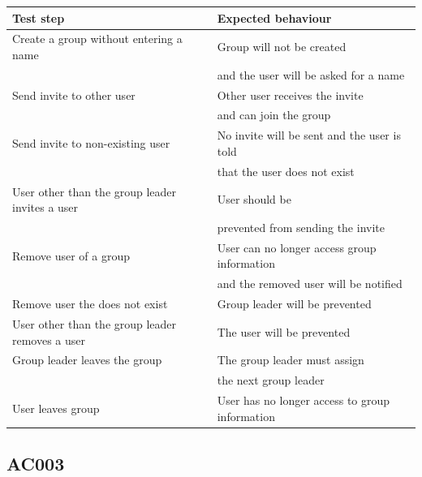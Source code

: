 \documentclass[12pt]{article}
\theoremstyle{definition}
\begin{document}
\begin{tabular}{|l|l|}
\hline
Test step & Expected behaviour \\ \hline
Create a group without entering a name & Group will not be created \\ 
 & and the user will be asked for a name \\ \hline
Send invite to other user & Other user receives the invite \\
& and can join the group \\ \hline
Send invite to non-existing user & No invite will be sent and the user is told \\
& that the user does not exist \\ \hline
User other than the group leader invites a user & User should be \\ & prevented from sending the invite \\ \hline
Remove user of a group & User can no longer access group information \\
& and the removed user will be notified \\ \hline
Remove user the does not exist & Group leader will be prevented\\ \hline
User other than the group leader removes a user & The user will be prevented \\ \hline
Group leader leaves the group & The group leader must assign \\
& the next group leader \\ \hline
User leaves group & User has no longer access to group information \\ \hline
\end{tabular}

\subsection{AC003}
\end{document}
